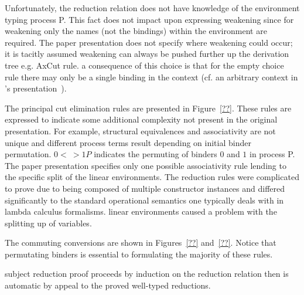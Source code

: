 
Unfortunately, the reduction relation does not have knowledge of the
environment typing process P. This fact does not impact upon expressing
weakening since for weakening only the names (not the bindings) within the
environment are required. The paper presentation does not specify where
weakening could occur; it is tacitly assumed weakening can always be pushed
further up the derivation tree e.g. AxCut rule. a consequence of this choice
is that for the empty choice rule there may only be a single binding in the
context (cf. an arbitrary context in \citeauthor{Wadler:2014}'s
presentation~\cite{Wadler:2014}).




The principal cut elimination rules are presented in Figure~\ref{??}. These
rules are expressed to indicate some additional complexity not present in the
original presentation. For example, structural equivalences and associativity
are not unique and different process terms result depending on initial binder
permutation. ${0 <~> 1}P$ indicates the permuting of binders $0$ and $1$ in
process P. The paper presentation specifies only one possible associativity
rule lending to the specific split of the linear environments. The reduction
rules were complicated to prove due to being composed of multiple constructor
instances and differed significantly to the standard operational semantics one
typically deals with in lambda calculus formalisms.
linear environments caused a problem with the splitting up of variables.






The commuting conversions are shown in Figures~\ref{??} and~\ref{??}. Notice
that permutating binders is essential to formulating the majority of these
rules.



subject reduction proof proceeds by induction on the reduction relation then
is automatic by appeal to the proved well-typed reductions.


